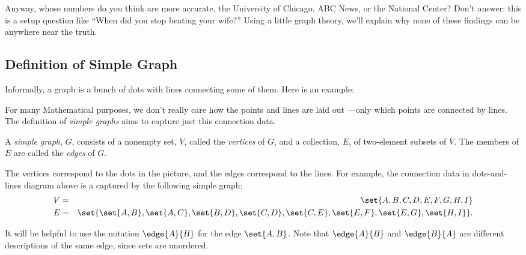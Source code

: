   Anyway, whose numbers do you think are more accurate, the University of
  Chicago, ABC News, or the National Center?  Don't answer: this is a setup
  question like ``When did you stop beating your wife?''  Using a little
  graph theory, we'll explain why none of these findings can be anywhere
  near the truth.


\label{degreessec}

\subsection{Definition of Simple Graph}

Informally, a graph is a bunch of dots with lines connecting some of
them.  Here is an example:


For many Mathematical purposes, we don't really care how the points and
lines are laid out ---only which points are connected by lines.  The
definition of \emph{simple graphs} aims to capture just this connection
data.

\begin{definition}\label{graphdef} 
A \emph{simple graph}, $G$, consists of a nonempty set, $V$, called the
\emph{vertices} of $G$, and a collection, $E$, of two-element subsets of
$V$.  The members of $E$ are called the \emph{edges} of $G$.
\end{definition}

The vertices correspond to the dots in the picture, and the edges
correspond to the lines.  For example, the connection data in
dots-and-lines diagram above is a captured by the following simple graph:
\begin{eqnarray*}
V & = & \set{A, B, C, D, E, F, G, H, I} \\
E & = & \set{ \set{A, B}, \set{A, C}, \set{B, D}, \set{C, D},
              \set{C, E}, \set{E, F}, \set{E, G}, \set{H, I} }.
\end{eqnarray*}

It will be helpful to use the notation $\edge{A}{B}$ for the edge
$\set{A,B}$.  Note that $\edge{A}{B}$ and $\edge{B}{A}$ are different
descriptions of the same edge, since sets are unordered.

